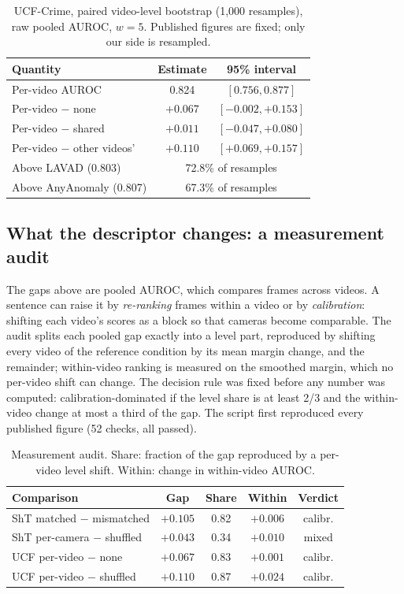 \documentclass[conference]{IEEEtran}
\begin{document}
\begin{table}[t]
\caption{UCF-Crime, paired video-level bootstrap (1{,}000 resamples), raw
pooled AUROC, $w{=}5$. Published figures are fixed; only our side is resampled.}
\label{tab:ucfboot}
\centering\footnotesize
\begin{tabular}{@{}p{3.3cm}cc@{}}
\toprule
\textbf{Quantity} & \textbf{Estimate} & \textbf{95\% interval} \\
\midrule
Per-video AUROC & 0.824 & $[0.756, 0.877]$ \\
Per-video $-$ none & $+0.067$ & $[-0.002, +0.153]$ \\
Per-video $-$ shared & $+0.011$ & $[-0.047, +0.080]$ \\
Per-video $-$ other videos' & $+0.110$ & $[+0.069, +0.157]$ \\
\midrule
Above LAVAD (0.803) & \multicolumn{2}{c}{72.8\% of resamples} \\
Above AnyAnomaly (0.807) & \multicolumn{2}{c}{67.3\% of resamples} \\
\bottomrule
\end{tabular}
\end{table}

\subsection{What the descriptor changes: a measurement audit}
\label{sec:res-within}
The gaps above are pooled AUROC, which compares frames across videos. A
sentence can raise it by \emph{re-ranking} frames within a video or by
\emph{calibration}: shifting each video's scores as a block so that cameras
become comparable. The audit splits each pooled gap exactly into a level part,
reproduced by shifting every video of the reference condition by its mean margin
change, and the remainder; within-video ranking is measured on the smoothed
margin, which no per-video shift can change. The decision rule was fixed before
any number was computed: calibration-dominated if the level share is at least
2/3 and the within-video change at most a third of the gap. The script first
reproduced every published figure (52 checks, all passed).

\begin{table}[t]
\caption{Measurement audit. Share: fraction of the gap reproduced by a
per-video level shift. Within: change in within-video AUROC.}
\label{tab:audit}
\centering\footnotesize
\setlength{\tabcolsep}{3pt}
\begin{tabular}{@{}p{3.2cm}cccc@{}}
\toprule
\textbf{Comparison} & \textbf{Gap} & \textbf{Share} & \textbf{Within} & \textbf{Verdict} \\
\midrule
ShT matched $-$ mismatched & $+0.105$ & 0.82 & $+0.006$ & calibr. \\
ShT per-camera $-$ shuffled & $+0.043$ & 0.34 & $+0.010$ & mixed \\
UCF per-video $-$ none & $+0.067$ & 0.83 & $+0.001$ & calibr. \\
UCF per-video $-$ shuffled & $+0.110$ & 0.87 & $+0.024$ & calibr. \\
\bottomrule
\end{tabular}
\end{table}
\end{document}
